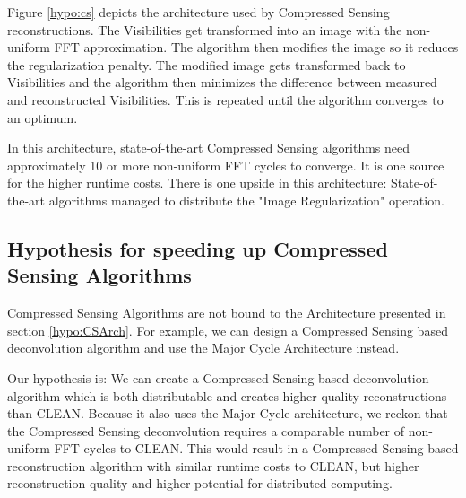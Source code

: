 Figure \ref{hypo:cs} depicts the architecture used by Compressed Sensing reconstructions. The Visibilities get transformed into an image with the non-uniform FFT approximation. The algorithm then modifies the image so it reduces the regularization penalty. The modified image gets transformed back to Visibilities and the algorithm then minimizes the difference between measured and reconstructed Visibilities. This is repeated until the algorithm converges to an optimum.

In this architecture, state-of-the-art Compressed Sensing algorithms need approximately 10 or more non-uniform FFT cycles to converge. It is one source for the higher runtime costs. There is one upside in this architecture: State-of-the-art algorithms managed to distribute the "Image Regularization" operation.

\subsection{Hypothesis for speeding up Compressed Sensing Algorithms}
Compressed Sensing Algorithms are not bound to the Architecture presented in section \ref{hypo:CSArch}. For example, we can design a Compressed Sensing based deconvolution algorithm and use the Major Cycle Architecture instead.

Our hypothesis is: We can create a Compressed Sensing based deconvolution algorithm which is both distributable and creates higher quality reconstructions than CLEAN. Because it also uses the Major Cycle architecture, we reckon that the Compressed Sensing deconvolution requires a comparable number of non-uniform FFT cycles to CLEAN. This would result in a Compressed Sensing based reconstruction algorithm with similar runtime costs to CLEAN, but higher reconstruction quality and higher potential for distributed computing.


